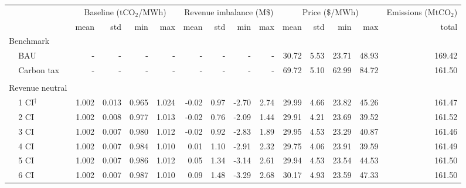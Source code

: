 \begin{tabular}{ll*{13}{r}}
\toprule
              &      & \multicolumn{4}{c}{Baseline (tCO$_{2}$/MWh)} & \multicolumn{4}{c}{Revenue imbalance (M\$)} & \multicolumn{4}{c}{Price (\$/MWh)} & Emissions (MtCO$_{2}$) \\
              &      &                     mean &    std &    min &    max &                    mean &    std &     min &    max &           mean &   std &    min &    max &                  total \\
\midrule
\multicolumn{2}{l}{Benchmark} &&&&&&&&&&&&&\\ & BAU &                        - &      - &      - &      - &                       - &      - &       - &      - &          30.72 &  5.53 &  23.71 &  48.93 &                 169.42 \\
              & Carbon tax &                        - &      - &      - &      - &                       - &      - &       - &      - &          69.72 &  5.10 &  62.99 &  84.72 &                 161.50 \\
&&&&&&&&&&&&&& \\ \multicolumn{2}{l}{Revenue neutral} &&&&&&&&&&&&&\\ & 1 CI$^{\dagger}$ &                    1.002 &  0.013 &  0.965 &  1.024 &                   -0.02 &   0.97 &   -2.70 &   2.74 &          29.99 &  4.66 &  23.82 &  45.26 &                 161.47 \\
              & 2 CI &                    1.002 &  0.008 &  0.977 &  1.013 &                   -0.02 &   0.76 &   -2.09 &   1.44 &          29.91 &  4.21 &  23.69 &  39.52 &                 161.52 \\
              & 3 CI &                    1.002 &  0.007 &  0.980 &  1.012 &                   -0.02 &   0.92 &   -2.83 &   1.89 &          29.95 &  4.53 &  23.29 &  40.87 &                 161.46 \\
              & 4 CI &                    1.002 &  0.007 &  0.984 &  1.010 &                    0.01 &   1.10 &   -2.91 &   2.32 &          29.75 &  4.06 &  23.91 &  39.59 &                 161.49 \\
              & 5 CI &                    1.002 &  0.007 &  0.986 &  1.012 &                    0.05 &   1.34 &   -3.14 &   2.61 &          29.94 &  4.53 &  23.54 &  44.53 &                 161.50 \\
              & 6 CI &                    1.002 &  0.007 &  0.987 &  1.010 &                    0.09 &   1.48 &   -3.29 &   2.68 &          30.17 &  4.93 &  23.59 &  47.33 &                 161.50 \\

\end{tabular}
